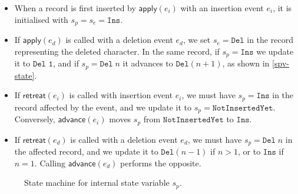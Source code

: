 \documentclass[sigplan,10pt]{acmart}
\begin{document}
\begin{itemize}
\item When a record is first inserted by $\mathsf{apply}(e_i)$ with an insertion event $e_i$, it is initialised with $s_p = s_e = \texttt{Ins}$.
\item If $\mathsf{apply}(e_d)$ is called with a deletion event $e_d$, we set $s_e = \texttt{Del}$ in the record representing the deleted character. In the same record, if $s_p = \texttt{Ins}$ we update it to $\texttt{Del 1}$, and if $s_p = \texttt{Del}\; n$ it advances to $\texttt{Del} (n+1)$, as shown in \autoref{spv-state}.
\item If $\mathsf{retreat}(e_i)$ is called with insertion event $e_i$, we must have $s_p = \texttt{Ins}$ in the record affected by the event, and we update it to $s_p = \texttt{NotInsertedYet}$. Conversely, $\mathsf{advance}(e_i)$ moves $s_p$ from $\texttt{NotInsertedYet}$ to $\texttt{Ins}$.
\item If $\mathsf{retreat}(e_d)$ is called with a deletion event $e_d$, we must have $s_p = \texttt{Del}\; n$ in the affected record, and we update it to $\texttt{Del} (n-1)$ if $n>1$, or to $\texttt{Ins}$ if $n=1$. Calling $\mathsf{advance}(e_d)$ performs the opposite.
\end{itemize}

\begin{figure}
  \caption{State machine for internal state variable $s_p$.}
  \label{spv-state}
\end{figure}
\end{document}
